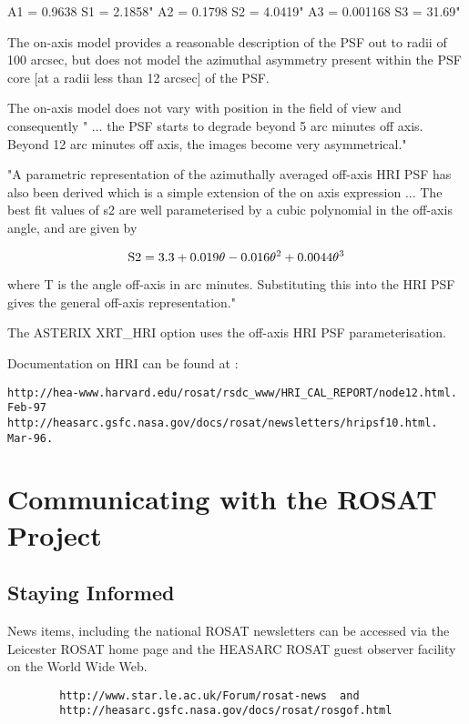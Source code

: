 \documentclass[11pt,fleqn]{article}    %
\begin{document}
    A1 = 0.9638 S1 = 2.1858"
    A2 = 0.1798 S2 = 4.0419"
    A3 = 0.001168 S3 = 31.69"

 The on-axis model provides a reasonable description of the PSF out to
 radii of 100 arcsec, but does not model the azimuthal asymmetry
 present within the PSF core [at a radii less than 12 arcsec] of the PSF.

 The on-axis model does not vary  with position in the field  of view and
consequently " ... the
 PSF starts to degrade beyond 5 arc minutes off axis. Beyond 12 arc minutes
 off     axis,     the      images      become    very      asymmetrical."

"A parametric representation of the azimuthally averaged off-axis HRI PSF
has also been derived which is a simple extension of the on axis expression
... The best fit values of s2 are well parameterised by a cubic polynomial
in the off-axis angle, and are given by 

\begin{displaymath}
\rm   S2 = 3.3 + 0.019\theta - 0.016\theta^2 + 0.0044\theta^3
\end{displaymath}

where T is the angle off-axis in arc minutes. Substituting this into the
HRI PSF gives the general off-axis representation."

The ASTERIX XRT_HRI option uses the off-axis HRI PSF parameterisation. 

Documentation on HRI can be found at :  
\begin{verbatim}
http://hea-www.harvard.edu/rosat/rsdc_www/HRI_CAL_REPORT/node12.html. Feb-97
http://heasarc.gsfc.nasa.gov/docs/rosat/newsletters/hripsf10.html. Mar-96.
\end{verbatim}

\newpage
\section{Communicating with the ROSAT Project}

\subsection{Staying Informed}

News items, including the national ROSAT newsletters can be accessed
via the Leicester ROSAT home page and the HEASARC ROSAT guest observer
facility on the World Wide Web.

\begin{verbatim}
        http://www.star.le.ac.uk/Forum/rosat-news  and
        http://heasarc.gsfc.nasa.gov/docs/rosat/rosgof.html
\end{verbatim}
\end{document}
